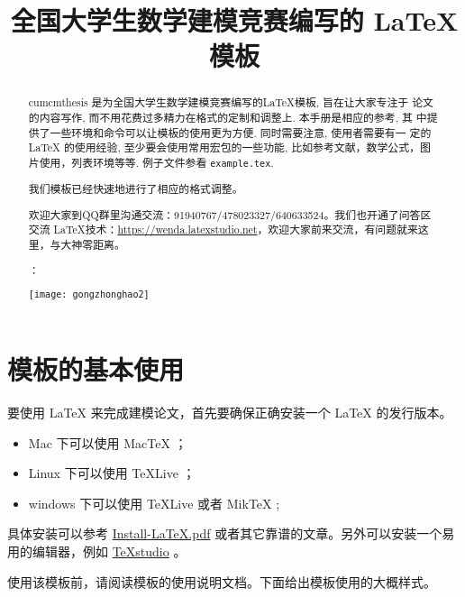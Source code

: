 \documentclass[withoutpreface,bwprint]{cumcmthesis} %
\title{全国大学生数学建模竞赛编写的 \LaTeX{} 模板}
\begin{document}
 \maketitle
 \begin{abstract}
cumcmthesis 是为全国大学生数学建模竞赛编写的\LaTeX{}模板, 旨在让大家专注于 论文的内容写作, 而不用花费过多精力在格式的定制和调整上. 本手册是相应的参考, 其 中提供了一些环境和命令可以让模板的使用更为方便. 同时需要注意, 使用者需要有一 定的 \LaTeX{} 的使用经验, 至少要会使用常用宏包的一些功能, 比如参考文献，数学公式，图片使用，列表环境等等. 例子文件参看 \texttt{example.tex}.



我们模板已经快速地进行了相应的格式调整。

欢迎大家到QQ群里沟通交流：91940767/478023327/640633524。我们也开通了问答区交流 \LaTeX{}技术：\url{https://wenda.latexstudio.net}，欢迎大家前来交流，有问题就来这里，与大神零距离。

：

\centerline{\texttt{[image: gongzhonghao2]}}

\end{abstract}



\section{模板的基本使用}

要使用 \LaTeX{} 来完成建模论文，首先要确保正确安装一个 \LaTeX{} 的发行版本。

\begin{itemize}
    \item Mac 下可以使用 Mac\TeX{} ；
    \item Linux 下可以使用 \TeX{}Live ；
    \item windows 下可以使用 \TeX{}Live 或者 Mik\TeX{} ;
\end{itemize}

具体安装可以参考 \href{https://github.com/OsbertWang/install_latex/releases/download/v4.6/Install-LaTeX.pdf}{Install-LaTeX.pdf} 或者其它靠谱的文章。另外可以安装一个易用的编辑器，例如 \href{https://github.com/texstudio-org/texstudio/releases/download/2.12.16/texstudio-2.12.16-win-qt5.exe}{\TeX{}studio} 。

使用该模板前，请阅读模板的使用说明文档。下面给出模板使用的大概样式。
\end{document}
